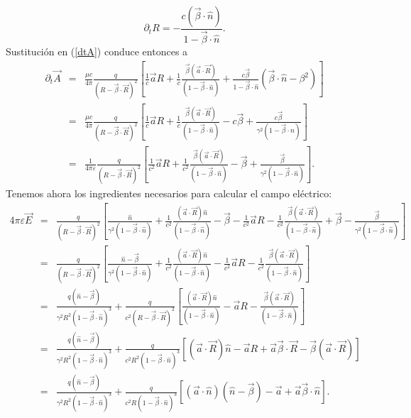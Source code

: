 \begin{equation}
\boxed{\partial_t R=-\frac{c(\vec\beta\cdot\hat{n})}{1-\vec{\beta}\cdot\hat{n}}.}
\end{equation}
Sustitución en (\ref{dtA}) conduce entonces a
\begin{eqnarray}
 \partial_t \vec{A}
&=&\frac{\mu c}{4\pi}\frac{q}{(R-\vec{\beta}\cdot\vec{R})^2}\left[\frac{1}{c}\vec{a}R+\frac{1}{c}
\frac{\vec{\beta}(\vec{a}\cdot\vec{R})}{(1-\vec{\beta}\cdot\hat{n})}+\frac{c\vec\beta}{1-\vec{\beta}\cdot\hat{n}}(\vec{\beta}\cdot\hat{n}-\beta^2)\right] \\
&=&\frac{\mu c}{4\pi}\frac{q}{(R-\vec{\beta}\cdot\vec{R})^2}\left[\frac{1}{c}\vec{a}R+\frac{1}{c}
\frac{\vec{\beta}(\vec{a}\cdot\vec{R})}{(1-\vec{\beta}\cdot\hat{n})}-c\vec\beta+\frac{c\vec\beta}{\gamma^2(1-\vec{\beta}\cdot\hat{n})}\right] \\
&=&\frac{1}{4\pi\varepsilon}\frac{q}{(R-\vec{\beta}\cdot\vec{R})^2}\left[\frac{1}{c^2}\vec{a}R+\frac{1}{c^2}\frac{\vec{\beta}(\vec{a}\cdot\vec{R})}{(1-\vec{\beta}\cdot\hat{n})}-\vec\beta+\frac{\vec\beta}{\gamma^2(1-\vec{\beta}\cdot\hat{n})}\right] .
\end{eqnarray}
Tenemos ahora los ingredientes necesarios para calcular el campo eléctrico:
\begin{eqnarray}
4\pi\varepsilon\vec{E}&=&\frac{q}{(R-\vec{\beta}\cdot\vec{R})^2}\left[\frac{\hat{n}}{\gamma^2(1-\vec{\beta}\cdot\hat{n})}+\frac{1}{c^2}\frac{(\vec{a}\cdot\vec{R})\hat{n}}{(1-\vec{\beta}\cdot\hat{n})}-\vec\beta-\frac{1}{c^2}\vec{a}R-\frac{1}{c^2}\frac{\vec{\beta}(\vec{a}\cdot\vec{R})}{(1-\vec{\beta}\cdot\hat{n})}+\vec\beta-\frac{\vec\beta}{\gamma^2(1-\vec{\beta}\cdot\hat{n})}\right] \nonumber \\
&=&\frac{q}{(R-\vec{\beta}\cdot\vec{R})^2}\left[\frac{\hat{n}-\vec\beta}{\gamma^2(1-\vec{\beta}\cdot\hat{n})}+\frac{1}{c^2}\frac{(\vec{a}\cdot\vec{R})\hat{n}}{(1-\vec{\beta}\cdot\hat{n})}-\frac{1}{c^2}\vec{a}R-\frac{1}{c^2}\frac{\vec{\beta}(\vec{a}\cdot\vec{R})}{(1-\vec{\beta}\cdot\hat{n})}\right] \\
&=&\frac{q(\hat{n}-\vec\beta)}{\gamma^2R^2(1-\vec{\beta}\cdot\hat{n})^3}+\frac{q}{c^2(R-\vec{\beta}\cdot\vec{R})^2}\left[\frac{(\vec{a}\cdot\vec{R})\hat{n}}{(1-\vec{\beta}\cdot\hat{n})}-\vec{a}R-\frac{\vec{\beta}(\vec{a}\cdot\vec{R})}{(1-\vec{\beta}\cdot\hat{n})}\right] \\
&=&\frac{q(\hat{n}-\vec\beta)}{\gamma^2R^2(1-\vec{\beta}\cdot\hat{n})^3}+\frac{q}{c^2R^2(1-\vec{\beta}\cdot\hat{n})^3}\left[(\vec{a}\cdot\vec{R})\hat{n}-\vec{a}R+\vec{a}\vec{\beta}\cdot\vec{R}-\vec{\beta}(\vec{a}\cdot\vec{R})\right] \\
&=&\frac{q(\hat{n}-\vec\beta)}{\gamma^2R^2(1-\vec{\beta}\cdot\hat{n})^3}+\frac{q}{c^2R(1-\vec{\beta}\cdot\hat{n})^3}\left[(\vec{a}\cdot\hat{n})(\hat{n}-\vec{\beta})-\vec{a}+\vec{a}\vec{\beta}\cdot\hat{n}\right] .
\end{eqnarray}
